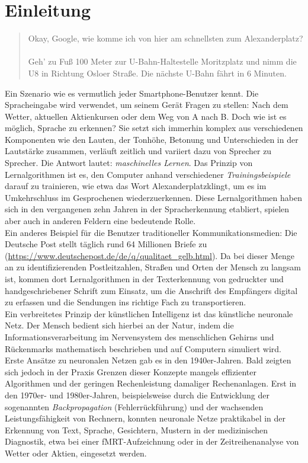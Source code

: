\section{Einleitung}
\begin{quote}
\glqq Okay, Google, wie komme ich von hier am schnellsten zum Alexanderplatz? \grqq\\
\\
\glqq Geh' zu Fuß 100 Meter zur U-Bahn-Haltestelle Moritzplatz und nimm die U8 in Richtung Osloer Straße. Die nächste U-Bahn fährt in 6 Minuten.\grqq
\end{quote}
Ein Szenario wie es vermutlich jeder Smartphone-Benutzer kennt. Die Spracheingabe wird verwendet, um seinem Gerät Fragen zu stellen: Nach dem Wetter, aktuellen Aktienkursen oder dem Weg von A nach B. Doch wie ist es möglich, Sprache zu erkennen? Sie setzt sich immerhin komplex aus verschiedenen Komponenten wie den Lauten, der Tonhöhe, Betonung und Unterschieden in der Lautstärke zusammen, verläuft zeitlich und variiert dazu von Sprecher zu Sprecher. Die Antwort lautet: \emph{maschinelles Lernen}. Das Prinzip von Lernalgorithmen ist es, den Computer anhand verschiedener \emph{Trainingsbeispiele} darauf zu trainieren, wie etwa das Wort \glqq Alexanderplatz\grqq klingt, um es im Umkehrschluss im Gesprochenen wiederzuerkennen. Diese Lernalgorithmen haben sich in den vergangenen zehn Jahren in der Spracherkennung etabliert, spielen aber auch in anderen Feldern eine bedeutende Rolle.\\
Ein anderes Beispiel für die Benutzer traditioneller Kommunikationsmedien: Die Deutsche Post stellt täglich rund 64 Millionen Briefe zu (\url{https://www.deutschepost.de/de/q/qualitaet_gelb.html}). Da bei dieser Menge an zu identifizierenden Postleitzahlen, Straßen und Orten der Mensch zu langsam ist, kommen dort Lernalgorithmen in der Texterkennung von gedruckter und handgeschriebener Schrift zum Einsatz, um die Anschrift des Empfängers digital zu erfassen und die Sendungen ins richtige Fach zu transportieren.\\
Ein verbreitetes Prinzip der künstlichen Intelligenz ist das künstliche neuronale Netz. Der Mensch bedient sich hierbei an der Natur, indem die Informationsverarbeitung im Nervensystem des menschlichen Gehirns und Rückenmarks mathematisch beschrieben und auf Computern simuliert wird.\\
Erste Ansätze zu neuronalen Netzen gab es in den 1940er-Jahren. Bald zeigten sich jedoch in der Praxis Grenzen dieser Konzepte mangels effizienter Algorithmen und der geringen Rechenleistung damaliger Rechenanlagen. Erst in den 1970er- und 1980er-Jahren, beispielsweise durch die Entwicklung der sogenannten \emph{Backpropagation} (Fehlerrückführung) und der wachsenden Leistungsfähigkeit von Rechnern, konnten neuronale Netze praktikabel in der Erkennung von Text, Sprache, Gesichtern, Mustern in der medizinischen Diagnostik, etwa bei einer fMRT-Aufzeichnung oder in der Zeitreihenanalyse von Wetter oder Aktien, eingesetzt werden.\\
